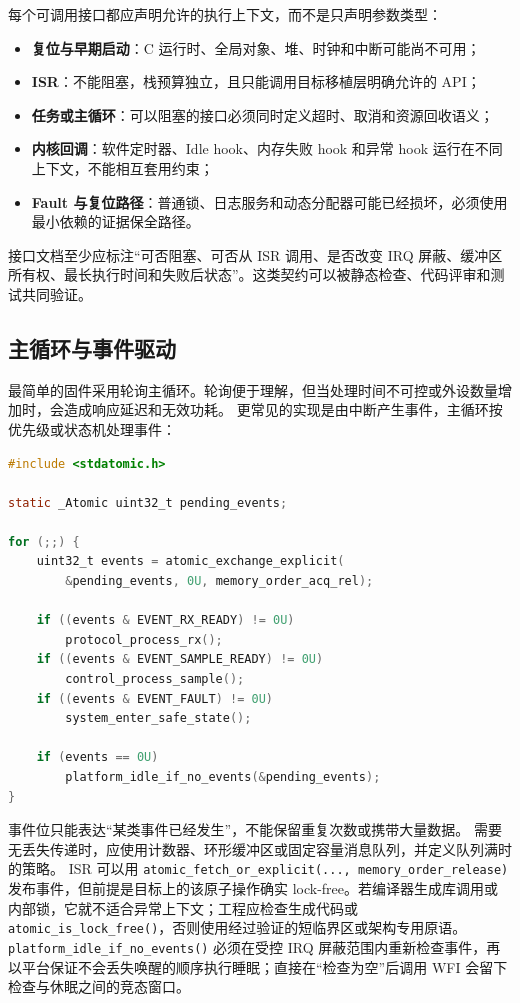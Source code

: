 每个可调用接口都应声明允许的执行上下文，而不是只声明参数类型：
\begin{itemize}
  \item \textbf{复位与早期启动}：C 运行时、全局对象、堆、时钟和中断可能尚不可用；
  \item \textbf{ISR}：不能阻塞，栈预算独立，且只能调用目标移植层明确允许的 API；
  \item \textbf{任务或主循环}：可以阻塞的接口必须同时定义超时、取消和资源回收语义；
  \item \textbf{内核回调}：软件定时器、Idle hook、内存失败 hook 和异常 hook 运行在不同上下文，不能相互套用约束；
  \item \textbf{Fault 与复位路径}：普通锁、日志服务和动态分配器可能已经损坏，必须使用最小依赖的证据保全路径。
\end{itemize}

接口文档至少应标注“可否阻塞、可否从 ISR 调用、是否改变 IRQ 屏蔽、缓冲区所有权、最长执行时间和失败后状态”。这类契约可以被静态检查、代码评审和测试共同验证。

\subsection{主循环与事件驱动}

最简单的固件采用轮询主循环。轮询便于理解，但当处理时间不可控或外设数量增加时，会造成响应延迟和无效功耗。
更常见的实现是由中断产生事件，主循环按优先级或状态机处理事件：

\begin{lstlisting}[language=C]
#include <stdatomic.h>

static _Atomic uint32_t pending_events;

for (;;) {
    uint32_t events = atomic_exchange_explicit(
        &pending_events, 0U, memory_order_acq_rel);

    if ((events & EVENT_RX_READY) != 0U)
        protocol_process_rx();
    if ((events & EVENT_SAMPLE_READY) != 0U)
        control_process_sample();
    if ((events & EVENT_FAULT) != 0U)
        system_enter_safe_state();

    if (events == 0U)
        platform_idle_if_no_events(&pending_events);
}
\end{lstlisting}

事件位只能表达“某类事件已经发生”，不能保留重复次数或携带大量数据。
需要无丢失传递时，应使用计数器、环形缓冲区或固定容量消息队列，并定义队列满时的策略。
ISR 可以用 \texttt{atomic\_fetch\_or\_explicit(..., memory\_order\_release)} 发布事件，但前提是目标上的该原子操作确实 lock-free。若编译器生成库调用或内部锁，它就不适合异常上下文；工程应检查生成代码或 \texttt{atomic\_is\_lock\_free()}，否则使用经过验证的短临界区或架构专用原语。
\texttt{platform\_idle\_if\_no\_events()} 必须在受控 IRQ 屏蔽范围内重新检查事件，再以平台保证不会丢失唤醒的顺序执行睡眠；直接在“检查为空”后调用 WFI 会留下检查与休眠之间的竞态窗口。

